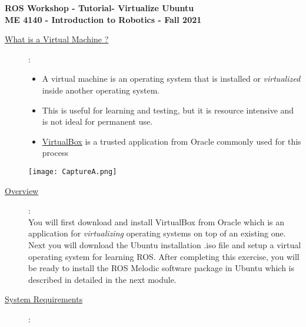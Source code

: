 \documentclass[12pt]{article}
\newcommand{\MNUM}{1} %
\newcommand{\MNAME}{Virtualize Ubuntu} %
\begin{document}
\thispagestyle{plain}

\begin{center}
   {\bf \Large ROS Workshop - Tutorial\hspc\MNUM\hspc - \MNAME}\vspace{3mm}\\
   {\bf \large ME 4140 - Introduction to Robotics - Fall 2021} \vspace{5mm}\\
\end{center}

\begin{description}

 	\item[\underline{What is a \href{https://en.wikipedia.org/wiki/Virtual_machine}{Virtual Machine} ?}]: \\
 	\begin{multicols}{2}
      		
            \begin{itemize}
                
                \item A virtual machine is an operating system that is installed or {\it virtualized} inside another operating system.
                \item This is useful for learning and testing, but it is resource intensive and is not ideal for permanent use. 
                \item \href{https://www.virtualbox.org/}{VirtualBox} is a trusted application from Oracle commonly used for this process
                
            \end{itemize}
            \texttt{[image: CaptureA.png]}\\
	\end{multicols}
	
	\item[\underline{Overview}]: \vspace{0mm} \\

		        You will first download and install VirtualBox from Oracle which is an application for {\it virtualizing} operating systems on top of an existing one. Next you will download the Ubuntu installation .iso file and setup a virtual operating system for learning ROS.  After completing this exercise, you will be ready to install the ROS Melodic software package in Ubuntu which is described in detailed in the next module. 

	\item[\underline{System Requirements}]: \vspace{0mm} \\


\end{description}
\end{document}
